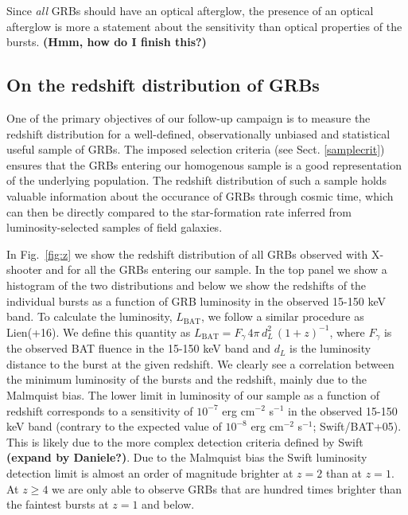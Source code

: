 \documentclass{aa}    %
\newcommand\todo[1]{\textbf{(#1)}}
\begin{document}
Since \textit{all} GRBs should have an optical afterglow, the presence of an optical afterglow is more a statement about the sensitivity than optical properties of the bursts. \todo{Hmm, how do I finish this?}


\subsection{On the redshift distribution of GRBs}


One of the primary objectives of our follow-up campaign is to measure the
redshift distribution for a well-defined, observationally unbiased and
statistical useful sample of GRBs. The imposed selection criteria (see Sect.
\ref{samplecrit}) ensures that the GRBs entering our homogenous sample is a good
representation of the underlying population. The redshift distribution of such
a sample holds valuable information about the occurance of GRBs through cosmic
time, which can then be directly compared to the star-formation rate inferred
from luminosity-selected samples of field galaxies.

In Fig.~\ref{fig:z} we show the redshift distribution of all GRBs observed with
X-shooter and for all the GRBs entering our sample. In the top panel we show a
histogram of the two distributions and below we show the redshifts of the
individual bursts as a function of GRB luminosity in the observed 15-150 keV
band. To calculate the luminosity, $L_{\mathrm{BAT}}$, we follow a similar
procedure as Lien(+16). We define this quantity as $L_{\mathrm{BAT}} =
F_{\gamma}\,4 \pi\,d_L^2\,(1+z)^{-1}$, where $F_{\gamma}$ is the observed BAT
fluence in the 15-150 keV band and $d_L$ is the luminosity distance to the
burst at the given redshift. We clearly see a correlation between the minimum
luminosity of the bursts and the redshift, mainly due to the Malmquist bias.
The lower limit in luminosity of our sample as a function of redshift
corresponds to a sensitivity of $10^{-7}$ erg cm$^{-2}$ s$^{-1}$ in the
observed 15-150 keV band (contrary to the expected value of $10^{-8}$ erg
cm$^{-2}$ s$^{-1}$; Swift/BAT+05). This is likely due to the more complex
detection criteria defined by Swift \textbf{(expand by Daniele?)}. Due to the Malmquist
bias the Swift luminosity detection limit is almost an order of magnitude
brighter at $z=2$ than at $z=1$. At $z\geq4$ we are only able to observe GRBs
that are hundred times brighter than the faintest bursts at $z=1$ and below.
\end{document}
